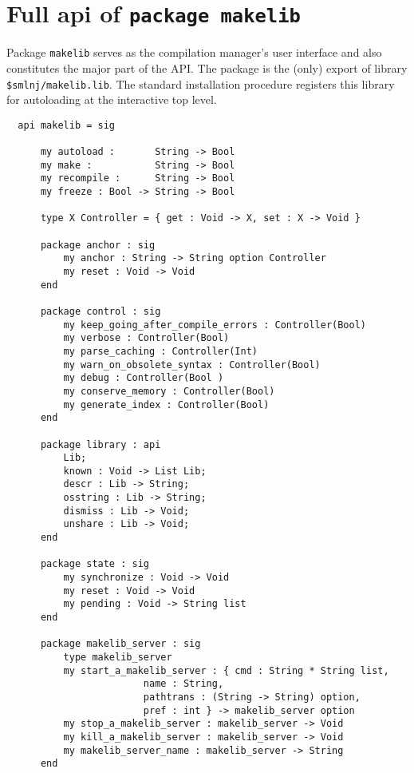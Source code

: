
\section{Full api of {\tt package makelib}}

Package {\tt makelib} serves as the compilation manager's user interface
and also constitutes the major part of the API.  The package is the
(only) export of library {\tt \$smlnj/makelib.lib}.  The standard
installation procedure registers this library for
autoloading at the interactive top level.

\begin{small}
\begin{verbatim}
  api makelib = sig

      my autoload :       String -> Bool
      my make :           String -> Bool
      my recompile :      String -> Bool
      my freeze : Bool -> String -> Bool

      type X Controller = { get : Void -> X, set : X -> Void }

      package anchor : sig
          my anchor : String -> String option Controller
          my reset : Void -> Void
      end

      package control : sig
          my keep_going_after_compile_errors : Controller(Bool)
          my verbose : Controller(Bool)
          my parse_caching : Controller(Int)
          my warn_on_obsolete_syntax : Controller(Bool) 
          my debug : Controller(Bool )
          my conserve_memory : Controller(Bool) 
          my generate_index : Controller(Bool) 
      end

      package library : api
          Lib;
          known : Void -> List Lib;
          descr : Lib -> String;
          osstring : Lib -> String;
          dismiss : Lib -> Void;
          unshare : Lib -> Void;
      end

      package state : sig
          my synchronize : Void -> Void
          my reset : Void -> Void
          my pending : Void -> String list
      end

      package makelib_server : sig
          type makelib_server
          my start_a_makelib_server : { cmd : String * String list,
                        name : String,
                        pathtrans : (String -> String) option,
                        pref : int } -> makelib_server option
          my stop_a_makelib_server : makelib_server -> Void
          my kill_a_makelib_server : makelib_server -> Void
          my makelib_server_name : makelib_server -> String
      end


\end{verbatim}
\end{small}
